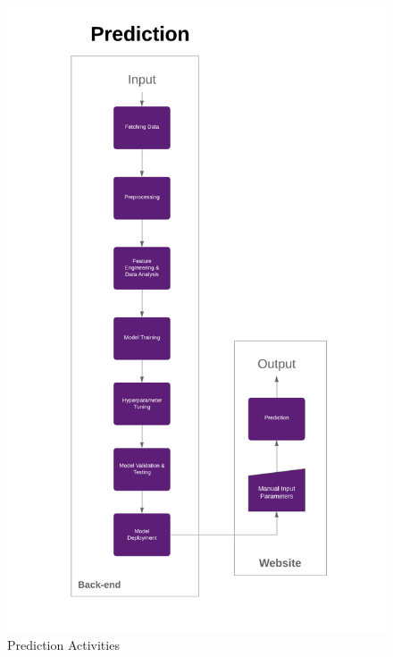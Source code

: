 \documentclass{scrreprt}
\begin{document}
\begin{figure}[h!]
    \centering
    \includegraphics[width=15cm]{COVID-19 Predictive Analysis.png}
    \caption{Prediction Activities}
    \label{fig:Prediction Activities}
\end{figure}
\newpage
\end{document}
